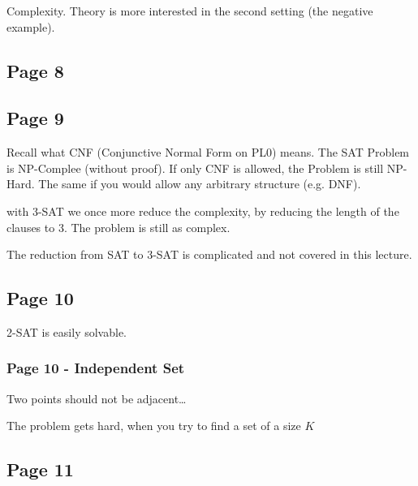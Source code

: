 \documentclass[a4paper]{article}
\begin{document}
Complexity. Theory is more interested in the second setting (the negative
example).

\subsection{Page 8}
 \begin{center}
\end{center}

\subsection{Page 9}

Recall what CNF (Conjunctive Normal Form on PL0) means. The SAT Problem is
NP-Complee (without proof). If only CNF is allowed, the Problem is still
NP-Hard. The same if you would allow any arbitrary structure (e.g. DNF).

with 3-SAT we once more reduce the complexity, by reducing the length of the
clauses to 3. The problem is still as complex.

The reduction from SAT to 3-SAT is complicated and not covered in this lecture.

\subsection{Page 10}
2-SAT is easily solvable.


\subsubsection{Page 10 - Independent Set}
Two points should not be adjacent\ldots

The problem gets hard, when you try to find a set of a size $K$

\subsection{Page 11}
\end{document}
